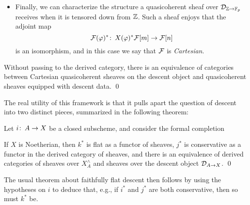 \begin{itemize}
\item Finally, we can characterize the structure a quasicoherent sheaf over $\mathcal{D}_{\mathbb Z \to \mathbb F_p}$ receives when it is tensored down from $\mathbb Z$.  Such a sheaf enjoys that the adjoint map \[\mathcal{F}(\varphi)^* \colon\thinspace X(\varphi)^* \mathcal{F}[m] \to \mathcal{F}[n]\] is an isomorphism, and in this case we say that $\mathcal{F}$ is \textit{Cartesian}.
\end{itemize}

\begin{lemma}
Without passing to the derived category, there is an equivalence of categories between Cartesian quasicoherent sheaves on the descent object and quasicoherent sheaves equipped with descent data. \qed
\end{lemma}

The real utility of this framework is that it pulls apart the question of descent into two distinct pieces, summarized in the following theorem:
\begin{theorem}
Let $i\colon\thinspace A \to X$ be a closed subscheme, and consider the formal completion
\begin{center}
\end{center}
If $X$ is Noetherian, then $k^*$ is flat as a functor of sheaves, $j^*$ is conservative as a functor in the derived category of sheaves, and there is an equivalence of derived categories of sheaves over $X^\wedge_A$ and sheaves over the descent object $\mathcal{D}_{A \to X}$. \qed
\end{theorem}

\begin{remark}
The usual theorem about faithfully flat descent then follows by using the hypotheses on $i$ to deduce that, e.g., if $i^*$ and $j^*$ are both conservative, then so must $k^*$ be.
\end{remark}


